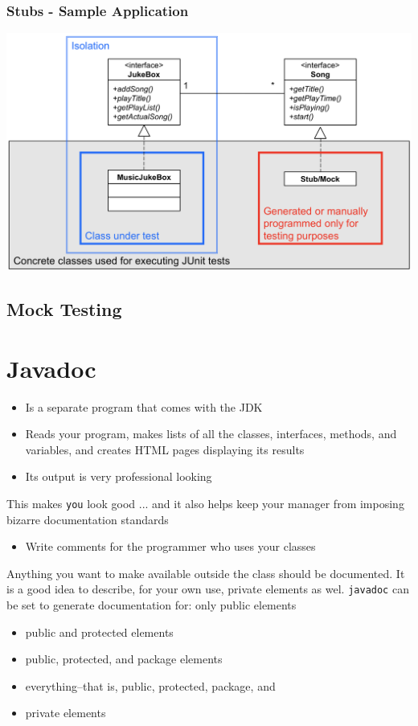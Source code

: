 \documentclass[10pt]{article}
\begin{document}
    \subsubsection{Stubs - Sample Application}
    \begin{center}
    	\includegraphics[scale=0.3]{assets/stubs.png}
    \end{center}
       
    \subsection{Mock Testing}
	\newpage
	
	
	
	
    \section{Javadoc}
    \begin{itemize}
        \item Is a separate program that comes with the JDK
        \item Reads your program, makes lists of all the classes, interfaces, methods, and variables, and creates HTML pages displaying its results
        \item Its output is very professional looking
    \end{itemize}

    This makes \texttt{you} look good ... and it also helps keep your manager from imposing bizarre documentation standards
    \begin{itemize}
        \item Write comments for the programmer who uses your classes
    \end{itemize}
    Anything you want to make available outside the class should be documented. It is a good idea to describe, for your own use, private elements as wel. \texttt{javadoc} can be set to generate documentation for: only public elements
    \begin{itemize}
        \item public and protected elements
        \item public, protected, and package elements
        \item everything--that is, public, protected, package, and
        \item private elements
    \end{itemize}
\end{document}
